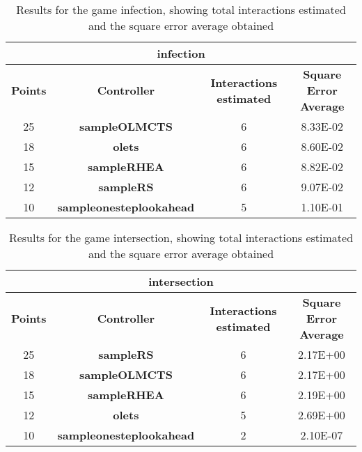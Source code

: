 \begin{table*}[!t]
\begin{center}
\begin{adjustbox}{width=1\textwidth}
\begin{tabular}{|c|c|c|c|}
\hline
\multicolumn{4}{|c|}{\textbf{infection}}\\
\hline
\textbf{Points} & \textbf{Controller} & \textbf{Interactions estimated} & \textbf{Square Error Average}\\
\hline
25 & \textbf{sampleOLMCTS} & 6 & 8.33E-02
 \\
\hline
18 & \textbf{olets} & 6 & 8.60E-02
 \\
\hline
15 & \textbf{sampleRHEA} & 6 & 8.82E-02
 \\
\hline
12 & \textbf{sampleRS} & 6 & 9.07E-02
 \\
\hline
10 & \textbf{sampleonesteplookahead} & 5 & 1.10E-01
 \\
\hline
\end{tabular}
\end{adjustbox}
\caption{Results for the game infection, showing total interactions estimated and the square error average obtained}
\label{tab:weights}
\end{center}
\end{table*}
\begin{table*}[!t]
\begin{center}
\begin{adjustbox}{width=1\textwidth}
\begin{tabular}{|c|c|c|c|}
\hline
\multicolumn{4}{|c|}{\textbf{intersection}}\\
\hline
\textbf{Points} & \textbf{Controller} & \textbf{Interactions estimated} & \textbf{Square Error Average}\\
\hline
25 & \textbf{sampleRS} & 6 & 2.17E+00
 \\
\hline
18 & \textbf{sampleOLMCTS} & 6 & 2.17E+00
 \\
\hline
15 & \textbf{sampleRHEA} & 6 & 2.19E+00
 \\
\hline
12 & \textbf{olets} & 5 & 2.69E+00
 \\
\hline
10 & \textbf{sampleonesteplookahead} & 2 & 2.10E-07
 \\
\hline
\end{tabular}
\end{adjustbox}
\caption{Results for the game intersection, showing total interactions estimated and the square error average obtained}
\label{tab:weights}
\end{center}
\end{table*}
